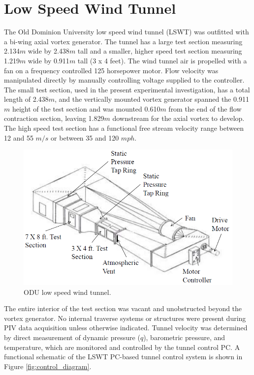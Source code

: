 
\section{Low Speed Wind Tunnel}

The Old Dominion University low 
speed wind tunnel (LSWT) was outfitted with a bi-wing axial vortex generator. 
The tunnel has a large test section measuring 2.134$m$ wide by 2.438$m$ 
tall and a smaller, higher speed test section measuring 1.219$m$ wide by 
0.911$m$ tall (3 x 4 feet). The 
wind tunnel air is propelled with a fan on a frequency controlled 125 
horsepower motor. 
Flow velocity was manipulated directly by manually controlling
voltage supplied to the controller. 
The small test section, used in the present experimental investigation, has a 
total length of 2.438$m$, and the vertically mounted vortex generator 
spanned the 0.911$m$ height of the test section and was 
mounted 0.610$m$ from the end of the flow contraction section, leaving 1.829$m$ 
downstream for the axial 
vortex to develop. The high speed test section has a functional free stream 
velocity range between 12 and 55  $m/s$ or between 35 and 120 $mph$.

\vspace{32pt}
\begin{figure}[H]
\centering
\includegraphics[width=5in]{figs/setup/odulswt_diagram}
\caption{ODU low speed wind tunnel.}
\label{fig:odulswt}
\end{figure}

The entire interior of the test section was vacant and unobstructed beyond the 
vortex generator. 
No internal traverse systems or structures 
were present during PIV data acquisition unless otherwise indicated. Tunnel 
velocity was determined by direct measurement of dynamic pressure ($q$), 
barometric pressure, and temperature, which 
are monitored and controlled by the tunnel control PC. A functional schematic 
of the LSWT PC-based tunnel control system is shown in Figure 
\ref{fig:control_diagram}.

